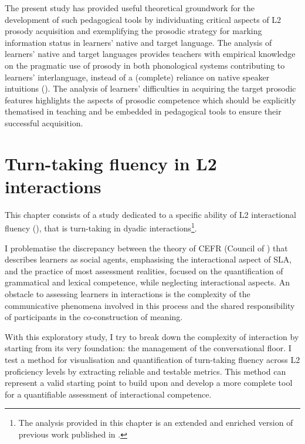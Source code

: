 The present study has provided useful theoretical groundwork for the development of such pedagogical tools by individuating critical aspects of L2 prosody acquisition and exemplifying the prosodic strategy for marking information status in learners’ native and target language. The analysis of learners’ native and target languages provides teachers with empirical knowledge on the pragmatic use of prosody in both phonological systems contributing to learners’ interlanguage, instead of a (complete) reliance on native speaker intuitions (\citealt{DerwingMunro2015}). The analysis of learners’ difficulties in acquiring the target prosodic features highlights the aspects of prosodic competence which should be explicitly thematised in teaching and be embedded in pedagogical tools to ensure their successful acquisition.


\section{Turn-taking fluency in L2 interactions}
\hypertarget{Toc191305923}{}
This chapter consists of a study dedicated to a specific ability of L2 interactional fluency (\citealt{Peltonen2024,Peltonen2020}), that is turn-taking in dyadic interactions\footnote{The analysis provided in this chapter is an extended and enriched version of previous work published in \citet{SbrannaEtAl2020}.}. 

I problematise the discrepancy between the theory of CEFR (Council of \citealt{Europe2020}) that describes learners as social agents, emphasising the interactional aspect of SLA, and the practice of most assessment realities, focused on the quantification of grammatical and lexical competence, while neglecting interactional aspects. An obstacle to assessing learners in interactions is the complexity of the communicative phenomena involved in this process and the shared responsibility of participants in the co-construction of meaning. 

With this exploratory study, I try to break down the complexity of interaction by starting from its very foundation: the management of the conversational floor. I test a method for visualisation and quantification of turn-taking fluency across L2 proficiency levels by extracting reliable and testable metrics. This method can represent a valid starting point to build upon and develop a more complete tool for a quantifiable assessment of interactional competence.

